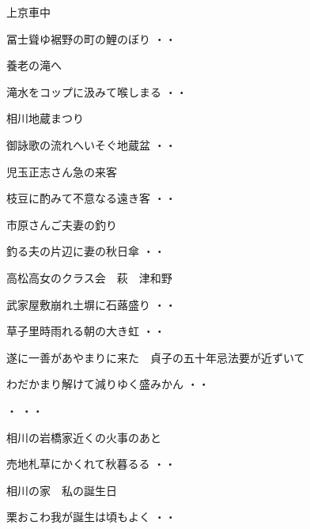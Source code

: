 上京車中
\begin{shiika}冨士聳ゆ裾野の町の鯉のぼり
\hfill{・・}\end{shiika}
\vspace{0.6cm}
養老の滝へ
\begin{shiika}滝水をコップに汲みて喉しまる
\hfill{・・}\end{shiika}
\vspace{0.6cm}
相川地蔵まつり
\begin{shiika}御詠歌の流れへいそぐ地蔵盆
\hfill{・・}\end{shiika}
\vspace{0.6cm}
児玉正志さん急の来客
\begin{shiika}枝豆に酌みて不意なる遠き客
\hfill{・・}\end{shiika}
\vspace{0.6cm}
市原さんご夫妻の釣り
\begin{shiika}釣る夫の片辺に妻の秋日傘
\hfill{・・}\end{shiika}
\vspace{0.6cm}
高松高女のクラス会　萩　津和野
\begin{shiika}武家屋敷崩れ土塀に石蕗盛り
\hfill{・・}\end{shiika}
\begin{shiika}草子里時雨れる朝の大き虹
\hfill{・・}\end{shiika}
\vspace{0.6cm}
遂に一善があやまりに来た　貞子の五十年忌法要が近ずいて
\begin{shiika}わだかまり解けて減りゆく盛みかん
\hfill{・・}\end{shiika}
\vspace{0.6cm}
\begin{shiika}・
\hfill{・・}\end{shiika}
\vspace{0.6cm}
相川の岩橋家近くの火事のあと
\begin{shiika}売地札草にかくれて秋暮るる
\hfill{・・}\end{shiika}
\vspace{0.6cm}
相川の家　私の誕生日
\begin{shiika}栗おこわ我が誕生は頃もよく
\hfill{・・}\end{shiika}
